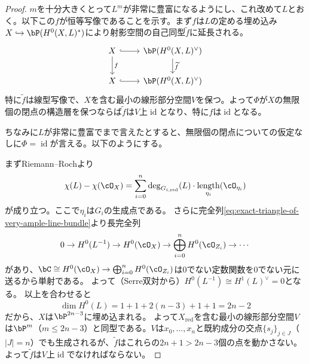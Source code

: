 \documentclass[uplatex, a4paper, dvipdfmx]{jsarticle}
\theoremstyle{definition}
\DeclareMathOperator{\id}{\mathrm{id}}
\DeclareMathOperator{\red}{\mathrm{red}}
\DeclareMathOperator{\length}{\mathrm{length}}
\begin{document}
\begin{proof}
    $m$を十分大きくとって$L^m$が非常に豊富になるようにし、これ改めて$L$とおく。以下この$f$が恒等写像であることを示す。まず$f$は$L$の定める埋め込み$X \hookrightarrow \bP(H^0(X, L)^*)$により射影空間の自己同型$\widetilde{f}$に延長される。
    \[
        \begin{tikzcd}
            X \ar[r, hook] \ar[d, "f"] & \bP(H^0(X, L)^\vee) \ar[d, "\widetilde{f}"] \\
            X \ar[r, hook] & \bP(H^0(X, L)^\vee)
        \end{tikzcd}
    \]
    特に$\widetilde{f}$は線型写像で、$X$を含む最小の線形部分空間$V$を保つ。よって$\Phi$が$X$の無限個の閉点の構造層を保つならば$\widetilde{f}$は$V$上$\id$となり、特に$f$は$\id$となる。

    ちなみに$L$が非常に豊富でまで言えたとすると、無限個の閉点についての仮定なしに$\Phi = \id$が言える。以下のようにする。

    まずRiemann--Rochより
    \begin{equation}
        \chi(L) - \chi(\cO_X) = \sum_{i=0}^n \deg_{G_{i,\red}}(L) \cdot \length_{\eta_i}(\cO_{\eta_i})
    \end{equation}
    が成り立つ。ここで$\eta_i$は$G_i$の生成点である。
    さらに完全列\eqref{eq:exact-triangle-of-very-ample-line-bundle}より長完全列
    \begin{equation}
        0 \to H^0(L^{-1}) \to H^0(\cO_X) \to \bigoplus_{i=0}^n H^0(\cO_{Z_i}) \to \cdots
    \end{equation}
    があり、$\bC \cong H^0(\cO_X) \to \bigoplus_{i=0}^n H^0(\cO_{Z_i})$は$0$でない定数関数を$0$でない元に送るから単射である。
    よって（Serre双対から）$H^0(L^{-1}) \cong H^1(L)^\vee = 0$となる。
    以上を合わせると
    \begin{equation}
        \dim H^0(L) = 1 + 1 + 2(n-3) + 1 + 1 = 2n-2
    \end{equation}
    だから、$X$は$\bP^{2n-3}$に埋め込まれる。
    よって$X_{\red}$を含む最小の線形部分空間$V$は$\bP^{m}$（$m \leq 2n-3$）と同型である。$V$は$x_0, \dots, x_n$と既約成分の交点$\{s_j\}_{j \in J}$（$|J| = n$）でも生成されるが、$\widetilde{f}$はこれらの$2n+1 >2n-3$個の点を動かさない。よって$\widetilde{f}$は$V$上$\id$でなければならない。


\end{proof}
\end{document}
